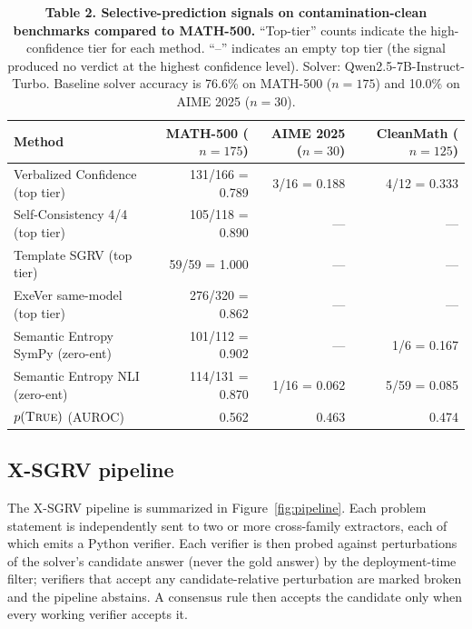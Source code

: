 \documentclass[11pt]{article}
\begin{document}
\begin{table}[h]
\centering
\caption{\textbf{Table 2. Selective-prediction signals on contamination-clean benchmarks compared to MATH-500.} ``Top-tier'' counts indicate the high-confidence tier for each method. ``--'' indicates an empty top tier (the signal produced no verdict at the highest confidence level). Solver: Qwen2.5-7B-Instruct-Turbo. Baseline solver accuracy is 76.6\% on MATH-500 ($n{=}175$) and 10.0\% on AIME 2025 ($n{=}30$).}
\label{tab:contam}
\small
\begin{tabular}{lrrr}
\toprule
Method & MATH-500 ($n{=}175$) & AIME 2025 ($n{=}30$) & CleanMath ($n{=}125$) \\
\midrule
Verbalized Confidence (top tier) & 131/166 = 0.789 & 3/16 = 0.188 & 4/12 = 0.333 \\
Self-Consistency 4/4 (top tier) & 105/118 = 0.890 & --- & --- \\
Template SGRV (top tier) & 59/59 = 1.000 & --- & --- \\
ExeVer same-model (top tier) & 276/320 = 0.862 & --- & --- \\
Semantic Entropy SymPy (zero-ent) & 101/112 = 0.902 & --- & 1/6 = 0.167 \\
Semantic Entropy NLI (zero-ent)   & 114/131 = 0.870 & 1/16 = 0.062 & 5/59 = 0.085 \\
$p(\textsc{True})$ (AUROC) & 0.562 & 0.463 & 0.474 \\
\bottomrule
\end{tabular}
\end{table}

\subsection{X-SGRV pipeline}

The X-SGRV pipeline is summarized in Figure~\ref{fig:pipeline}. Each problem statement is independently sent to two or more cross-family extractors, each of which emits a Python verifier. Each verifier is then probed against perturbations of the solver's candidate answer (never the gold answer) by the deployment-time filter; verifiers that accept any candidate-relative perturbation are marked broken and the pipeline abstains. A consensus rule then accepts the candidate only when every working verifier accepts it.
\end{document}
